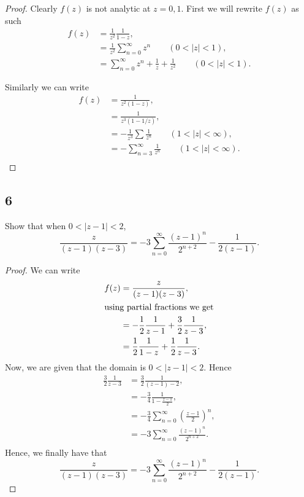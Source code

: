 \documentclass{article}
\begin{document}
\begin{proof}
    Clearly $f(z)$ is not analytic at $z=0,1$. First we will rewrite $f(z)$ as such
    \begin{align*}
        f(z) & = \frac{1}{z^2}\frac{1}{1-z},                                              \\
             & = \frac{1}{z^2}\sum_{n=0}^\infty z^n \qquad (0 < |z| < 1),                 \\
             & = \sum_{n=0}^\infty z^n +\frac{1}{z} + \frac{1}{z^2} \qquad (0 < |z| < 1).
    \end{align*}

    Similarly we can write
    \begin{align*}
        f(z) & =  \frac{1}{z^2(1-z)},                                     \\
             & = \frac{1}{z^3(1-1/z)},                                    \\
             & = -\frac{1}{z^3} \sum \frac{1}{z^n} \qquad (1<|z|<\infty), \\
             & = -\sum_{n=3}^\infty\frac{1}{z^n} \qquad (1<|z|<\infty).   \\
    \end{align*}
\end{proof}

\subsection*{6}
Show that when $0<|z-1|<2$,
\[\frac{z}{(z-1)(z-3)}= -3\sum_{n=0}^\infty \frac{(z-1)^n}{2^{n+2}} - \frac{1}{2(z-1)}.\]

\begin{proof}
    We can write
    \begin{align*}
        f(z) & = \frac{z}{(z-1)(z-3)},                                   \\
        \intertext{using partial fractions we get}
             & = -\frac{1}{2}\frac{1}{z-1} + \frac{3}{2}\frac{1}{z - 3}, \\
             & = \frac{1}{2}\frac{1}{1-z} + \frac{1}{2}\frac{1}{z-3}.
    \end{align*}
    Now, we are given that the domain is $0<|z-1|<2$. Hence
    \begin{align*}
        \frac{3}{2}\frac{1}{z-3} & = \frac{3}{2}\frac{1}{(z-1)-2},                               \\
                                 & = -\frac{3}{4}\frac{1}{1-\frac{z-1}{2}},                      \\
                                 & = -\frac{3}{4}\sum_{n=0}^\infty \left(\frac{z-1}{2}\right)^n, \\
                                 & = -3\sum_{n=0}^\infty \frac{(z-1)^n}{2^{n+2}}.                \\
    \end{align*}
    Hence, we finally have that
    \[\frac{z}{(z-1)(z-3)}= -3\sum_{n=0}^\infty \frac{(z-1)^n}{2^{n+2}} - \frac{1}{2(z-1)}.\]
\end{proof}
\end{document}
